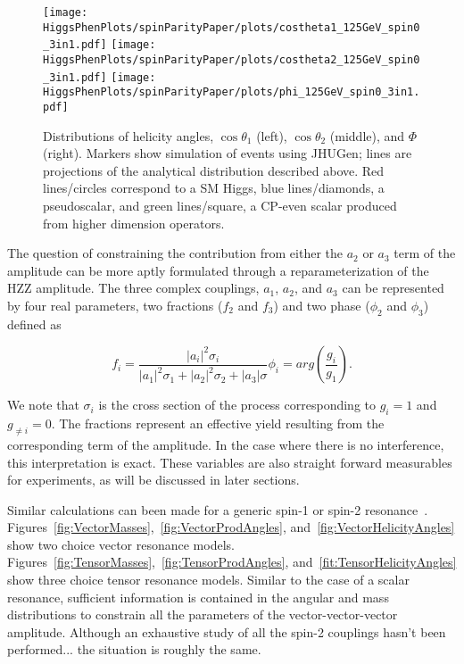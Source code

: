 \begin{figure}
\begin{center}
\texttt{[image: HiggsPhenPlots/spinParityPaper/plots/costheta1\_125GeV\_spin0\_3in1.pdf]}
\texttt{[image: HiggsPhenPlots/spinParityPaper/plots/costheta2\_125GeV\_spin0\_3in1.pdf]}
\texttt{[image: HiggsPhenPlots/spinParityPaper/plots/phi\_125GeV\_spin0\_3in1.pdf]}
\label{fig:ScalarHelicityAngles}
\caption{Distributions of helicity angles, $\cos\theta_1$ (left), 
$\cos\theta_2$ (middle), and $\Phi$ (right). Markers show simulation of 
events using JHUGen; lines are projections
of the analytical distribution described above.  Red lines/circles correspond
to a SM Higgs, blue lines/diamonds, a pseudoscalar, and green lines/square, 
a CP-even scalar produced from higher dimension operators.}
\end{center}
\end{figure}

The question of constraining the contribution
from either the $a_2$ or $a_3$ term of the amplitude can be more aptly 
formulated through a reparameterization of the HZZ amplitude.  The 
three complex couplings, $a_1$, $a_2$, and $a_3$ can be represented by
four real parameters, two fractions ($f_2$ and $f_3$) and two phase 
($\phi_2$ and $\phi_3$) defined as
\begin{center}
\begin{subequations}
  \begin{equation}
    f_i = \frac{|a_i|^2\sigma_i }{|a_1|^2\sigma_1+|a_2|^2\sigma_2+|a_3|\sigma}
    \end{equation}
  \begin{equation}
    \phi_i = arg(\frac{g_i}{g_1}).
    \end{equation}
\end{subequations}
\end{center}
We note that $\sigma_i$ is the cross section of the process corresponding
to $g_i=1$ and $g_{\neq i}=0$.  The fractions represent an effective yield 
resulting from the corresponding term of the amplitude.  In the case where
there is no interference, this interpretation is exact.  These variables
are also straight forward measurables for experiments, as will be discussed
in later sections.  

Similar calculations can been made for a generic spin-1 or spin-2 
resonance~\cite{??}.  
Figures~\ref{fig:VectorMasses},~\ref{fig:VectorProdAngles}, 
and~\ref{fig:VectorHelicityAngles} show two choice vector 
resonance models.  
Figures~\ref{fig:TensorMasses},~\ref{fig:TensorProdAngles}, 
and~\ref{fit:TensorHelicityAngles}
show three choice tensor 
resonance models.  Similar to the case of a scalar resonance, sufficient
information is contained in the angular and mass distributions to 
constrain all the parameters of the vector-vector-vector amplitude. 
Although an exhaustive study of all the spin-2 couplings hasn't been 
performed... the situation is roughly the same.  

